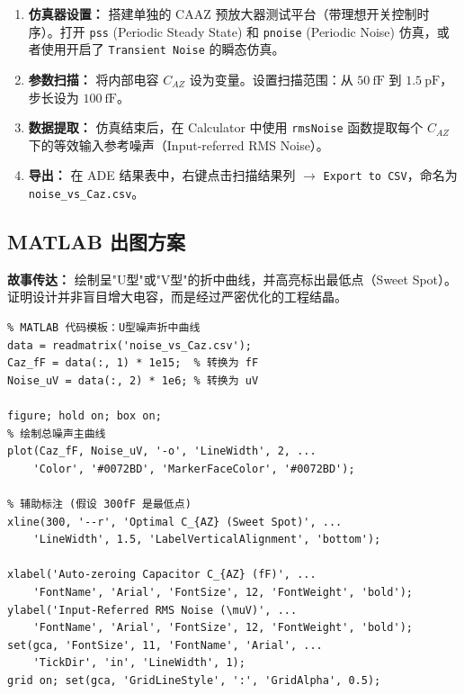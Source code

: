 \documentclass[11pt,a4paper,UTF8]{ctexart}
\begin{document}
\begin{enumerate}[leftmargin=*]
    \item \textbf{仿真器设置：} 搭建单独的 CAAZ 预放大器测试平台（带理想开关控制时序）。打开 \texttt{pss} (Periodic Steady State) 和 \texttt{pnoise} (Periodic Noise) 仿真，或者使用开启了 \texttt{Transient Noise} 的瞬态仿真。
    
    \item \textbf{参数扫描：} 将内部电容 $C_{AZ}$ 设为变量。设置扫描范围：从 $\SI{50}{\femto\farad}$ 到 $\SI{1.5}{\pico\farad}$，步长设为 $\SI{100}{\femto\farad}$。
    
    \item \textbf{数据提取：} 仿真结束后，在 Calculator 中使用 \texttt{rmsNoise} 函数提取每个 $C_{AZ}$ 下的等效输入参考噪声（Input-referred RMS Noise）。
    
    \item \textbf{导出：} 在 ADE 结果表中，右键点击扫描结果列 $\rightarrow$ \texttt{Export to CSV}，命名为 \texttt{noise\_vs\_Caz.csv}。
\end{enumerate}

\subsection{MATLAB 出图方案}

\textbf{故事传达：} 绘制呈"U型"或"V型"的折中曲线，并高亮标出最低点（Sweet Spot）。证明设计并非盲目增大电容，而是经过严密优化的工程结晶。

\begin{lstlisting}
% MATLAB 代码模板：U型噪声折中曲线
data = readmatrix('noise_vs_Caz.csv');
Caz_fF = data(:, 1) * 1e15;  % 转换为 fF
Noise_uV = data(:, 2) * 1e6; % 转换为 uV

figure; hold on; box on;
% 绘制总噪声主曲线
plot(Caz_fF, Noise_uV, '-o', 'LineWidth', 2, ...
    'Color', '#0072BD', 'MarkerFaceColor', '#0072BD');

% 辅助标注 (假设 300fF 是最低点)
xline(300, '--r', 'Optimal C_{AZ} (Sweet Spot)', ...
    'LineWidth', 1.5, 'LabelVerticalAlignment', 'bottom');

xlabel('Auto-zeroing Capacitor C_{AZ} (fF)', ...
    'FontName', 'Arial', 'FontSize', 12, 'FontWeight', 'bold');
ylabel('Input-Referred RMS Noise (\muV)', ...
    'FontName', 'Arial', 'FontSize', 12, 'FontWeight', 'bold');
set(gca, 'FontSize', 11, 'FontName', 'Arial', ...
    'TickDir', 'in', 'LineWidth', 1);
grid on; set(gca, 'GridLineStyle', ':', 'GridAlpha', 0.5);
\end{lstlisting}
\end{document}
